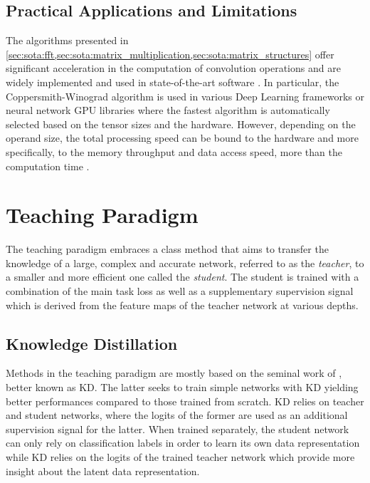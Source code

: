 \subsection{Practical Applications and Limitations}
The algorithms presented in
\cref{sec:sota:fft,sec:sota:matrix_multiplication,sec:sota:matrix_structures}
offer significant acceleration in the computation of convolution operations and
are widely implemented and used in state-of-the-art software
\cite{pytorch_vision,DBLP:journals/corr/AbadiABBCCCDDDG16}. In particular, the
Coppersmith-Winograd algorithm is used in various Deep Learning frameworks
\cite{DBLP:journals/corr/AbadiABBCCCDDDG16,DBLP:conf/nips/PaszkeGMLBCKLGA19} or
neural network \ac{GPU} libraries \cite{nvidia_cudnn} where the fastest
algorithm is automatically selected based on the tensor sizes and the hardware.
However, depending on the operand size, the total processing speed can be bound
to the hardware and more specifically, to the memory throughput and data access
speed, more than the computation time
\cite{DBLP:journals/pc/WhaleyPD01,DBLP:journals/cca/DrevetIS10}.\\

\section{Teaching Paradigm}\label{sec:sota:teaching_paradigm}

The teaching paradigm embraces a class method that aims to transfer the
knowledge of a large, complex and accurate network, referred to as the
\emph{teacher}, to a smaller and more efficient one called the \emph{student}.
The student is trained with a combination of the main task loss as well as a
supplementary supervision signal which is derived from the feature maps of the
teacher network at various depths.\\


\subsection{Knowledge Distillation}
Methods in the teaching paradigm are mostly based on the seminal work of
\citeauthor{DBLP:journals/corr/HintonVD15} \cite{DBLP:journals/corr/HintonVD15},
better known as \acf{KD}. The latter seeks to train simple networks with \ac{KD}
yielding better performances compared to those trained from scratch. \ac{KD}
relies on teacher and student networks, where the logits of the former are used
as an additional supervision signal for the latter. When trained separately, the
student network can only rely on classification labels in order to learn its own
data representation while \ac{KD} relies on the logits of the trained teacher
network which provide more insight about the latent data representation.\\

